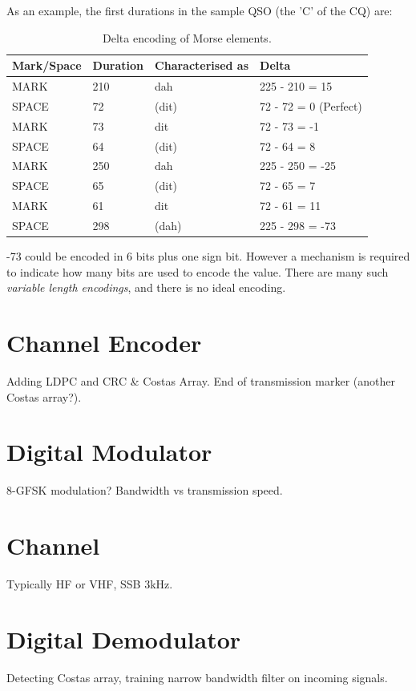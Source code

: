 \documentclass[a4paper]{tufte-handout}
\begin{document}
As an example, the first durations in the sample QSO (the 'C' of the CQ) are:
    \begin{table}[h]
        \selectfont
        \begin{tabular}{llll}
            \toprule
            Mark/Space & Duration & Characterised as & Delta \\
            \midrule
            MARK   & 210 & dah   & 225 - 210 = 15 \\
            SPACE  & 72  & (dit) & 72 - 72 = 0 (Perfect) \\
            MARK   & 73  & dit   & 72 - 73 = -1 \\
            SPACE  & 64  & (dit) & 72 - 64 = 8 \\
            MARK   & 250 & dah   & 225 - 250 = -25 \\
            SPACE  & 65  & (dit) & 72 - 65 = 7 \\
            MARK   & 61  & dit   & 72 - 61 = 11 \\
            SPACE  & 298 & (dah) & 225 - 298 = -73 \\
		\end{tabular}
		\caption{Delta encoding of Morse elements.}
		\label{table:delta-encoding}
	\end{table}

-73 could be encoded in 6 bits plus one sign bit. However a mechanism is required to indicate how many bits are used to encode the value. There are many such \emph{variable length encodings}, and there is no ideal encoding.


\section{Channel Encoder}
Adding LDPC and CRC \& Costas Array. End of transmission marker (another Costas array?).

\section{Digital Modulator}
8-GFSK modulation? Bandwidth vs transmission speed.

\section{Channel}
Typically HF or VHF, SSB 3kHz.

\section{Digital Demodulator}
Detecting Costas array, training narrow bandwidth filter on incoming signals. 
\end{document}
